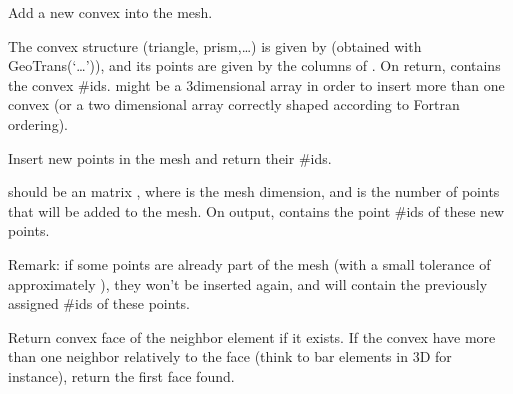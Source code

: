 \documentclass[a4paper,11pt,english]{sphinxmanual}
\begin{document}
\begin{fulllineitems}
\begin{itemize}
\end{itemize}

\begin{fulllineitems}
\label{\detokenize{python/cmdref_Mesh:getfem.Mesh.add_convex}}
Add a new convex into the mesh.

The convex structure (triangle, prism,…) is given by 
(obtained with GeoTrans(‘…’)), and its points are given by
the columns of . On return,  contains the convex \#ids.
 might be a 3\sphinxhyphen{}dimensional array in order to insert more than
one convex (or a two dimensional array correctly shaped according
to Fortran ordering).

\end{fulllineitems}


\begin{fulllineitems}
\label{\detokenize{python/cmdref_Mesh:getfem.Mesh.add_point}}
Insert new points in the mesh and return their \#ids.

 should be an  matrix , where  is the mesh
dimension, and  is the number of points that will be
added to the mesh. On output,  contains the point \#ids
of these new points.

Remark: if some points are already part of the mesh (with a small
tolerance of approximately ), they won’t be inserted again,
and  will contain the previously assigned \#ids of these
points.

\end{fulllineitems}


\begin{fulllineitems}
\label{\detokenize{python/cmdref_Mesh:getfem.Mesh.adjacent_face}}
Return convex face of the neighbor element if it exists.
If the convex have more than one neighbor
relatively to the face  (think to bar elements in 3D for instance),
return the first face found.


\end{fulllineitems}
\end{fulllineitems}
\end{document}
